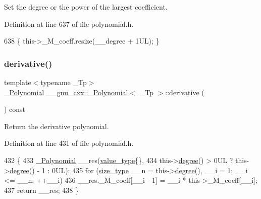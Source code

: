 Set the degree or the power of the largest coefficient. 

Definition at line 637 of file polynomial.\+h.


\begin{DoxyCode}
638       \{ this->\_M\_coeff.resize(\_\_degree + 1UL); \}
\end{DoxyCode}
\mbox{\label{class____gnu__cxx_1_1__Polynomial_a69e973ccaf5857251a8b7971e19a5ec7}} 
\subsubsection{\texorpdfstring{derivative()}{derivative()}}
{\footnotesize\ttfamily template$<$typename \+\_\+\+Tp$>$ \\
\hyperlink{class____gnu__cxx_1_1__Polynomial}{\+\_\+\+Polynomial} \hyperlink{class____gnu__cxx_1_1__Polynomial}{\+\_\+\+\_\+gnu\+\_\+cxx\+::\+\_\+\+Polynomial}$<$ \+\_\+\+Tp $>$\+::derivative (\begin{DoxyParamCaption}{ }\end{DoxyParamCaption}) const\hspace{0.3cm}{\ttfamily [inline]}}

Return the derivative polynomial. 

Definition at line 431 of file polynomial.\+h.


\begin{DoxyCode}
432       \{
433         \hyperlink{class____gnu__cxx_1_1__Polynomial_ad2baf4c12b7e3ab131a592afa3f391ae}{\_Polynomial} \_\_res(\hyperlink{class____gnu__cxx_1_1__Polynomial_a725563351f50e76084a7a016c06f8a53}{value\_type}\{\},
434                           this->\hyperlink{class____gnu__cxx_1_1__Polynomial_a07d9933aeeb9afbd823218ed921336cb}{degree}() > 0UL ? this->\hyperlink{class____gnu__cxx_1_1__Polynomial_a07d9933aeeb9afbd823218ed921336cb}{degree}() - 1 : 0UL);
435         \textcolor{keywordflow}{for} (\hyperlink{class____gnu__cxx_1_1__Polynomial_a8b25fcfd4acaad0c5c08b649c22da28a}{size\_type} \_\_n = this->\hyperlink{class____gnu__cxx_1_1__Polynomial_a07d9933aeeb9afbd823218ed921336cb}{degree}(), \_\_i = 1; \_\_i <= \_\_n; ++\_\_i)
436           \_\_res.\_M\_coeff[\_\_i - 1] = \_\_i * this->\_M\_coeff[\_\_i];
437         \textcolor{keywordflow}{return} \_\_res;
438       \}
\end{DoxyCode}
\mbox{\label{class____gnu__cxx_1_1__Polynomial_a7997059cf934fc454497be9074ebc958}} 
